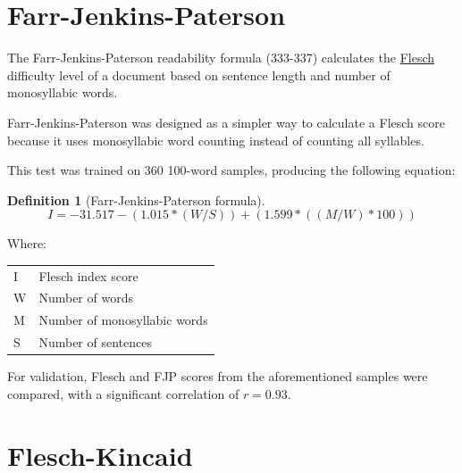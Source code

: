 \documentclass[
]{book}
\theoremstyle{definition}
\newtheorem{definition}{Definition}[chapter]
\theoremstyle{definition}
\theoremstyle{definition}
\theoremstyle{definition}
\theoremstyle{remark}
\begin{document}

\newpage

\hypertarget{farr-jenkins-paterson}{%
\section{\texorpdfstring{Farr-Jenkins-Paterson}{Farr-Jenkins-Paterson}}\label{farr-jenkins-paterson}}

The Farr-Jenkins-Paterson readability formula (333-337) calculates the \protect\hyperlink{flesch-test}{Flesch} difficulty level of a document based on sentence length and number of monosyllabic words.

Farr-Jenkins-Paterson was designed as a simpler way to calculate a Flesch score because it uses monosyllabic word counting instead of counting all syllables.

This test was trained on 360 100-word samples, producing the following equation:

\begin{definition}[Farr-Jenkins-Paterson formula]
\protect\hypertarget{def:fjp}{}{\label{def:fjp} {} }\[
I = -31.517 - (1.015*(W/S)) + (1.599*((M/W)*100))
\]
\end{definition}

Where:

\begin{longtable}[]{@{}
  >{\raggedright\arraybackslash}p{}
  >{\raggedright\arraybackslash}p{}@{}}
\toprule
\endhead
I & Flesch index score \\
W & Number of words \\
M & Number of monosyllabic words \\
S & Number of sentences \\
\bottomrule
\end{longtable}

For validation, Flesch and FJP scores from the aforementioned samples were compared, with a significant correlation of \(r = 0.93\).

\newpage

\hypertarget{flesch-kincaid-test}{%
\section{\texorpdfstring{Flesch-Kincaid}{Flesch-Kincaid}}\label{flesch-kincaid-test}}
\end{document}
